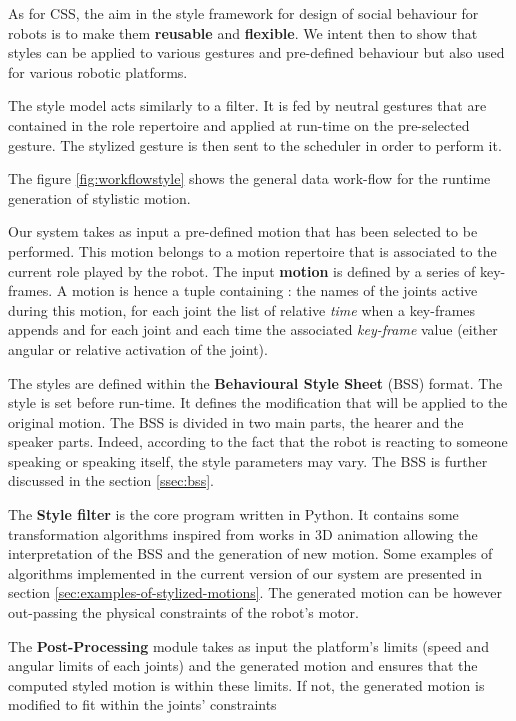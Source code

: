 \documentclass[smallextended]{svjour3}
\begin{document}
As for CSS, the aim in the style framework for design of social behaviour for robots is to make them \textbf{reusable }and \textbf{flexible}.
We intent then to show that styles can be applied to various gestures and pre-defined behaviour but also used for various robotic platforms. 

The style model acts similarly to a filter. 
It is fed by neutral gestures that are contained in the role repertoire and applied at run-time on the pre-selected gesture. 
The stylized gesture is then sent to the scheduler in order to perform it.

The figure \ref{fig:workflowstyle} shows the general data work-flow for the runtime generation of stylistic motion.

Our system takes as input a pre-defined motion that has been selected to be performed. 
This motion belongs to a motion repertoire that is associated to the current role played by the robot.
The input \textbf{motion} is defined by a series of key-frames.
A motion is hence a tuple containing : 
the names of the joints active during this motion,
for each joint the list of relative \textit{time} when a key-frames appends and
for each joint and each time the associated \textit{key-frame} value (either angular or relative activation of the joint).

The styles are defined within the \textbf{Behavioural Style Sheet} (BSS) format. 
The style is set before run-time. 
It defines the modification that will be applied to the original motion.
The BSS is divided in two main parts, the hearer and the speaker parts.
Indeed,  according to the fact that the robot is reacting to someone speaking or speaking itself, the style parameters may vary.
The BSS is further discussed in the section \ref{ssec:bss}.

The \textbf{Style filter} is the core program written in Python. 
It contains some transformation algorithms inspired from works in 3D animation allowing the interpretation of the BSS and the generation of new motion.
Some examples of algorithms implemented in the current version of our system are presented in section \ref{sec:examples-of-stylized-motions}.
The generated motion can be however out-passing the physical constraints of the robot's motor. 

The \textbf{Post-Processing} module takes as input the platform's limits (speed and angular limits of each joints) and the generated motion and ensures that the computed styled motion is within these limits.
If not, the generated motion is modified to fit within the joints' constraints
\end{document}
